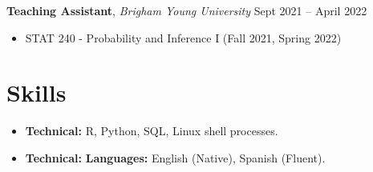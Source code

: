 \documentclass[11pt, letterpaper]{article}
\begin{document}
\vspace{4pt}
\textbf{Teaching Assistant}, \textit{Brigham Young University} \hfill Sept 2021 -- April 2022
\begin{itemize}
    \item STAT 240 - Probability and Inference I (Fall 2021, Spring 2022)
\end{itemize}


\section{Skills}
\begin{itemize}
    \item \textbf{Technical:} R, Python, SQL, Linux shell processes.
    \item \textbf{Technical:} \textbf{Languages:} English (Native), Spanish (Fluent).
\end{itemize}
\end{document}
